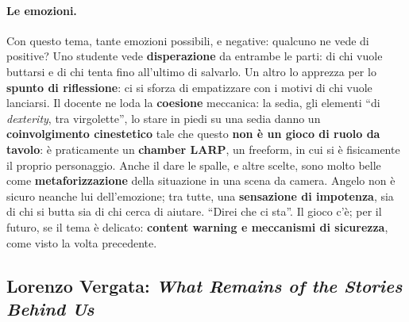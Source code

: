 \paragraph{Le emozioni.} Con questo tema, tante emozioni possibili, e negative:
qualcuno ne vede di positive? Uno studente vede \textbf{disperazione} da entrambe le
parti: di chi vuole buttarsi e di chi tenta fino all'ultimo di salvarlo. Un altro lo
apprezza per lo \textbf{spunto di riflessione}: ci si sforza di empatizzare con i
motivi di chi vuole lanciarsi. Il docente ne loda la \textbf{coesione} meccanica: la
sedia, gli elementi ``di \emph{dexterity}, tra virgolette'', lo stare in piedi su una
sedia danno un \textbf{coinvolgimento cinestetico} tale che questo \textbf{non è un
gioco di ruolo da tavolo}: è praticamente un \textbf{chamber LARP}, un freeform, in cui
si è fisicamente il proprio personaggio. Anche il dare le spalle, e altre scelte, sono
molto belle come \textbf{metaforizzazione} della situazione in una scena da camera.
Angelo non è sicuro neanche lui dell'emozione; tra tutte, una \textbf{sensazione di
impotenza}, sia di chi si butta sia di chi cerca di aiutare. ``Direi che ci sta''.
Il gioco c'è; per il futuro, se il tema è delicato: \textbf{content warning e
meccanismi di sicurezza}, come visto la volta precedente.

\subsection{Lorenzo Vergata: \emph{What Remains of the Stories Behind Us}}
\label{a6:sec:remains}

